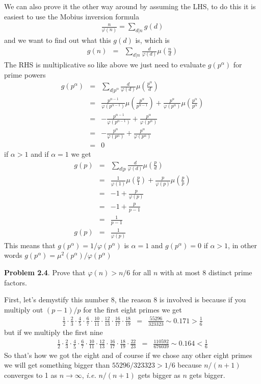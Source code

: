 \documentclass[aps,preprint,preprintnumbers,nofootinbib,showpacs,prd]{revtex4-1}
\newcommand{\ie}{{\it i.e.} }
\newcommand{\nbea}{\begin{eqnarray*}}
\newcommand{\neea}{\end{eqnarray*}}
\begin{document}
We can also prove it the other way around by assuming the LHS, to do this it is easiest to use the Mobius inversion formula
%
\nbea
\frac{n}{\varphi(n)} = \sum_{d|n} g(d)
\neea
%
and we want to find out what this $g(d)$ is, which is
%
\nbea
g(n) & = & \sum_{d|n} \frac{d}{\varphi(d)} \mu\left ( \frac{n}{d}\right )
\neea
%
The RHS is multiplicative so like above we just need to evaluate $g(p^\alpha)$ for prime powers
%
\nbea
g(p^\alpha) & = & \sum_{d|p^\alpha} \frac{d}{\varphi(d)} \mu\left ( \frac{p^\alpha}{d}\right ) \\
& = & \frac{p^{\alpha-1}}{\varphi(p^{\alpha-1})} \mu\left ( \frac{p^\alpha}{p^{\alpha-1}}\right ) + \frac{p^\alpha}{\varphi(p^\alpha)} \mu\left ( \frac{p^\alpha}{p^\alpha}\right ) \\
& = & -\frac{p^{\alpha-1}}{\varphi(p^{\alpha-1})} + \frac{p^\alpha}{\varphi(p^\alpha)} \\
& = & -\frac{p^\alpha}{\varphi(p^\alpha)}  + \frac{p^\alpha}{\varphi(p^\alpha)} \\
& = & 0
\neea
%
if $\alpha > 1$ and if $\alpha = 1$ we get
%
\nbea
g(p) & = & \sum_{d|p} \frac{d}{\varphi(d)} \mu\left ( \frac{p}{d}\right ) \\
& = & \frac{1}{\varphi(1)} \mu\left ( \frac{p}{1}\right ) + \frac{p}{\varphi(p)} \mu\left ( \frac{p}{p}\right ) \\
& = & -1 + \frac{p}{\varphi(p)} \\
& = & -1 + \frac{p}{p - 1} \\
& = & \frac{1}{p - 1} \\
g(p) & = & \frac{1}{\varphi(p)}
\neea
%
This means that $g(p^\alpha) = 1/\varphi(p^\alpha)$ is $\alpha = 1$ and $g(p^\alpha) = 0$ if $\alpha > 1$, in other words $g(p^\alpha) = \mu^2(p^\alpha)/\varphi(p^\alpha)$

{\bf Problem 2.4}. Prove that $\varphi(n) > n/6$ for all $n$ with at most $8$ distinct prime factors.

First, let's demystify this number $8$, the reason $8$ is involved is because if you multiply out $(p-1)/p$ for the first eight primes we get
%
\nbea
\frac{1}{2}\cdot\frac{2}{3}\cdot\frac{4}{5}\cdot\frac{6}{7}\cdot\frac{10}{11}\cdot\frac{12}{13}\cdot\frac{16}{17}\cdot\frac{18}{19} & = & \frac{55296}{323323} \sim 0.171  > \frac{1}{6}
\neea
%
but if we multiply the first nine
%
\nbea
\frac{1}{2}\cdot\frac{2}{3}\cdot\frac{4}{5}\cdot\frac{6}{7}\cdot\frac{10}{11}\cdot\frac{12}{13}\cdot\frac{16}{17}\cdot\frac{18}{19}\cdot\frac{22}{23} & = & \frac{110592}{676039} \sim 0.164  < \frac{1}{6}
\neea
%
So that's how we got the eight and of course if we chose any other eight primes we will get something bigger than $55296/323323>1/6$ because $n/(n+1)$ converges to 1 as $n \to \infty$, \ie $n/(n+1)$ gets bigger as $n$ gets bigger.
\end{document}
